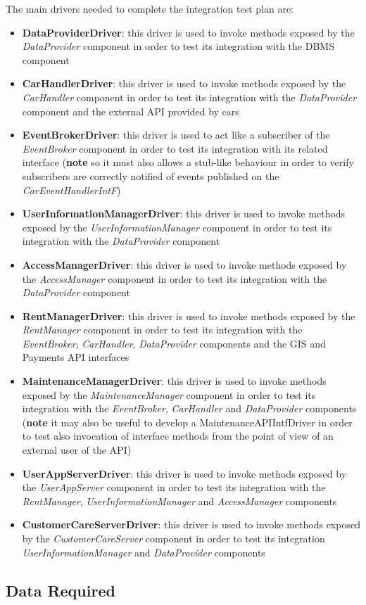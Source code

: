 The main drivers needed to complete the integration test plan are:
\begin{itemize}
	\item \textbf{DataProviderDriver}: this driver is used to invoke methods exposed by the \emph{DataProvider} component in order to test its integration with the DBMS component
	\item \textbf{CarHandlerDriver}: this driver is used to invoke methods exposed by the \emph{CarHandler} component in order to test its integration with the \emph{DataProvider} component and the external API provided by cars
	\item \textbf{EventBrokerDriver}: this driver is used to act like a subscriber of the \emph{EventBroker} component in order to test its integration with its related interface (\textbf{note} so it must also allows a stub-like behaviour in order to verify subscribers are correctly notified of events published on the \emph{CarEventHandlerIntF})
	\item \textbf{UserInformationManagerDriver}: this driver is used to invoke methods exposed by the \emph{UserInformationManager} component in order to test its integration with the \emph{DataProvider} component
	\item \textbf{AccessManagerDriver}: this driver is used to invoke methods exposed by the \emph{AccessManager} component in order to test its integration with the \emph{DataProvider} component
	\item \textbf{RentManagerDriver}: this driver is used to invoke methods exposed by the \emph{RentManager} component in order to test its integration with the \emph{EventBroker},  \emph{CarHandler}, \emph{DataProvider} components and the GIS and Payments API interfaces
	\item \textbf{MaintenanceManagerDriver}: this driver is used to invoke methods exposed by the \emph{MaintenanceManager} component in order to test its integration with the \emph{EventBroker},  \emph{CarHandler} and \emph{DataProvider} components (\textbf{note} it may also be useful to develop a MaintenanceAPIIntfDriver in order to test also invocation of interface methods from the point of view of an external user of the API)
	\item \textbf{UserAppServerDriver}: this driver is used to invoke methods exposed by the \emph{UserAppServer} component in order to test its integration with the \emph{RentManager}, \emph{UserInformationManager} and \emph{AccessManager} components
	\item \textbf{CustomerCareServerDriver}: this driver is used to invoke methods exposed by the \emph{CustomerCareServer} component in order to test its integration \emph{UserInformationManager} and \emph{DataProvider} components
\end{itemize}

\subsection{Data Required}
